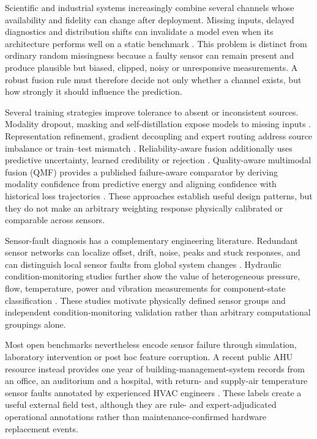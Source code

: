 \documentclass[11pt]{article}
\begin{document}
Scientific and industrial systems increasingly combine several channels whose availability and fidelity can change after deployment. Missing inputs, delayed diagnostics and distribution shifts can invalidate a model even when its architecture performs well on a static benchmark \citep{liu2025deployment,chakraborti2025personalized,mitra2023structured,wu2026survey}. This problem is distinct from ordinary random missingness because a faulty sensor can remain present and produce plausible but biased, clipped, noisy or unresponsive measurements. A robust fusion rule must therefore decide not only whether a channel exists, but how strongly it should influence the prediction.

Several training strategies improve tolerance to absent or inconsistent sources. Modality dropout, masking and self-distillation expose models to missing inputs \citep{neverova2016moddrop,li2024umdf,woo2023practices}. Representation refinement, gradient decoupling and expert routing address source imbalance or train--test mismatch \citep{wang2024gradient,mckinzie2023mismatch,yao2024drfuse,huang2025mgr}. Reliability-aware fusion additionally uses predictive uncertainty, learned credibility or rejection \citep{gao2024aleatoric,cho2025cocoon,park2025mome,sidheekh2025credibility,liu2025rejection,rabanser2025selective}. Quality-aware multimodal fusion (QMF) provides a published failure-aware comparator by deriving modality confidence from predictive energy and aligning confidence with historical loss trajectories \citep{zhang2023qmf}. These approaches establish useful design patterns, but they do not make an arbitrary weighting response physically calibrated or comparable across sensors.

Sensor-fault diagnosis has a complementary engineering literature. Redundant sensor networks can localize offset, drift, noise, peaks and stuck responses, and can distinguish local sensor faults from global system changes \citep{kullaa2011distinguishing,kullaa2013sensor,helwig2015sensorfault}. Hydraulic condition-monitoring studies further show the value of heterogeneous pressure, flow, temperature, power and vibration measurements for component-state classification \citep{helwig2015condition,ma2021multirate,keleko2023hydraulic,yildirim2025hydraulic}. These studies motivate physically defined sensor groups and independent condition-monitoring validation rather than arbitrary computational groupings alone.

Most open benchmarks nevertheless encode sensor failure through simulation, laboratory intervention or post hoc feature corruption. A recent public AHU resource instead provides one year of building-management-system records from an office, an auditorium and a hospital, with return- and supply-air temperature sensor faults annotated by experienced HVAC engineers \citep{wang2025ahuoperational,wang2024ahudataset}. These labels create a useful external field test, although they are rule- and expert-adjudicated operational annotations rather than maintenance-confirmed hardware replacement events.
\end{document}
